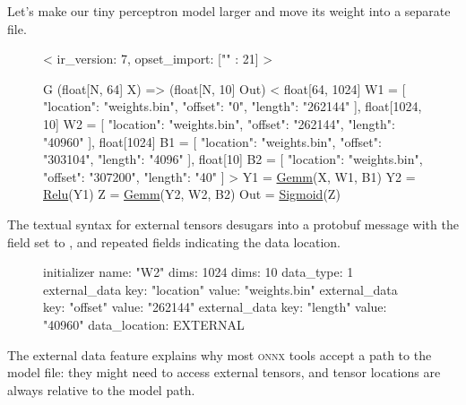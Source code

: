 \documentclass{article}
\begin{document}
Let's make our tiny perceptron model larger and move its weight into a separate file.

\begin{figure}
\begin{code}[linenumbers]
<
    ir_version: 7,
    opset_import: ["" : 21]
>

G (float[N, 64] X) => (float[N, 10] Out)
<
    float[64, 1024] W1 = [
        "location": "weights.bin", "offset": "0", "length": "262144"
    ],
    float[1024, 10] W2 = [
        "location": "weights.bin", "offset": "262144", "length": "40960"
    ],
    float[1024] B1 = [
        "location": "weights.bin", "offset": "303104", "length": "4096"
    ],
    float[10] B2 = [
        "location": "weights.bin", "offset": "307200", "length": "40"
    ]
>
{
    Y1 = \href{https://onnx.ai/onnx/operators/onnx__Gemm.html}{Gemm}(X, W1, B1)
    Y2 = \href{https://onnx.ai/onnx/operators/onnx__Relu.html}{Relu}(Y1)
    Z = \href{https://onnx.ai/onnx/operators/onnx__Gemm.html}{Gemm}(Y2, W2, B2)
    Out = \href{https://onnx.ai/onnx/operators/onnx__Sigmoid.html}{Sigmoid}(Z)
}
\end{code}
\end{figure}

The textual syntax for external tensors desugars into a protobuf message
with the \href{https://github.com/onnx/onnx/blob/0277a1f62550c0b9edc3e1016a50a42dc4c73cf1/onnx/onnx.proto3#L653}{} field set to ,
and repeated \href{https://github.com/onnx/onnx/blob/0277a1f62550c0b9edc3e1016a50a42dc4c73cf1/onnx/onnx.proto3#L642}{} fields indicating the data location.

\begin{figure}
\begin{code}
initializer {
  name: "W2"
  dims: 1024
  dims: 10
  data_type: 1
  external_data {
    key: "location"
    value: "weights.bin"
  }
  external_data {
    key: "offset"
    value: "262144"
  }
  external_data {
    key: "length"
    value: "40960"
  }
  data_location: EXTERNAL
}
\end{code}
\end{figure}

The external data feature explains why most \textsc{onnx} tools accept a path to the model file:
they might need to access external tensors,
and tensor locations are always relative to the model path.
\end{document}
